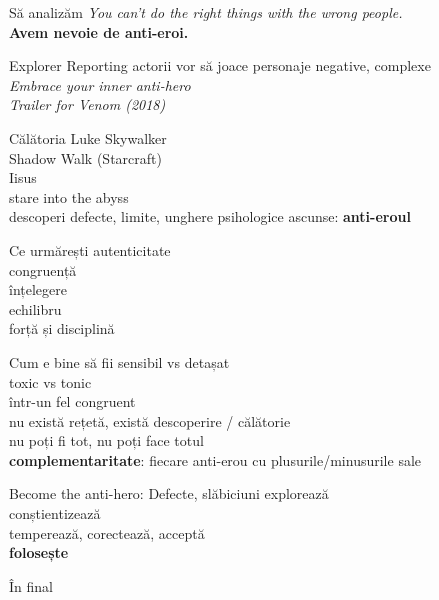 \documentclass{beamer}
\begin{document}
\begin{frame}{Să analizăm}
  \centering
  \Large
  \textit{You can't do the right things with the wrong people.} \\
  \vspace{1cm}
  \pause \textbf{Avem nevoie de anti-eroi.}
\end{frame}

\begin{frame}{Explorer Reporting}
  \centering
  \Large
  \pause actorii vor să joace personaje negative, complexe \\
  \vspace{1cm}
  \pause \textit{Embrace your inner anti-hero} \\
  \vspace{3mm}
  \hfill \textit{Trailer for Venom (2018)}
\end{frame}

\begin{frame}{Călătoria}
  \centering
  \Large
  \pause Luke Skywalker \\
  \pause Shadow Walk (Starcraft) \\
  \pause Iisus \\
  \pause stare into the abyss \\
  \pause descoperi defecte, limite, unghere psihologice ascunse: \textbf{anti-eroul}
\end{frame}

\begin{frame}{Ce urmărești}
  \centering
  \Large
  \pause autenticitate \\
  \pause congruență \\
  \pause înțelegere \\
  \pause echilibru \\
  \pause forță și disciplină
\end{frame}

\begin{frame}{Cum e bine să fii}
  \centering
  \Large
  \pause sensibil vs detașat \\
  \pause toxic vs tonic \\
  \pause într-un fel congruent \\
  \pause nu există rețetă, există descoperire / călătorie \\
  \pause nu poți fi tot, nu poți face totul \\
  \pause \textbf{complementaritate}: fiecare anti-erou cu plusurile/minusurile sale
\end{frame}

\begin{frame}{Become the anti-hero: Defecte, slăbiciuni}
  \centering
  \Large
  \pause explorează \\
  \pause conștientizează \\
  \pause temperează, corectează, acceptă \\
  \pause \textbf{folosește}
\end{frame}

\begin{frame}{În final}
  \centering
  \LARGE
\end{frame}
\end{document}
